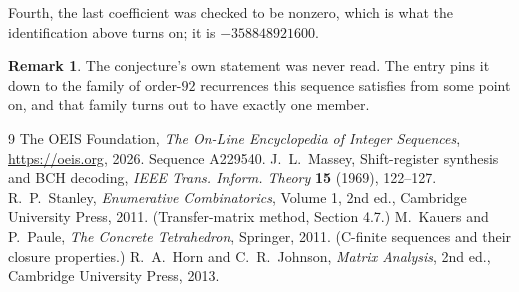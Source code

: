 \documentclass[11pt,a4paper]{article}
\theoremstyle{plain}
\theoremstyle{definition}
\newtheorem{remark}[theorem]{Remark}
\begin{document}
Fourth, the last coefficient was checked to be nonzero, which is what the identification above
turns on; it is $-358848921600$.

\begin{remark}
The conjecture's own statement was never read. The entry pins it down to the family of
order-$92$ recurrences this sequence satisfies from some point on, and that family turns
out to have exactly one member.
\end{remark}

\begin{thebibliography}{9}
 The OEIS Foundation, \emph{The On-Line Encyclopedia of Integer
Sequences}, \url{https://oeis.org}, 2026. Sequence A229540.
 J.~L.~Massey, Shift-register synthesis and BCH decoding, \emph{IEEE
Trans. Inform. Theory} \textbf{15} (1969), 122--127.
 R.~P.~Stanley, \emph{Enumerative Combinatorics}, Volume 1, 2nd ed.,
Cambridge University Press, 2011. (Transfer-matrix method, Section 4.7.)
 M.~Kauers and P.~Paule, \emph{The Concrete Tetrahedron}, Springer, 2011.
(C-finite sequences and their closure properties.)
 R.~A.~Horn and C.~R.~Johnson, \emph{Matrix Analysis}, 2nd ed., Cambridge
University Press, 2013.
\end{thebibliography}
\end{document}
